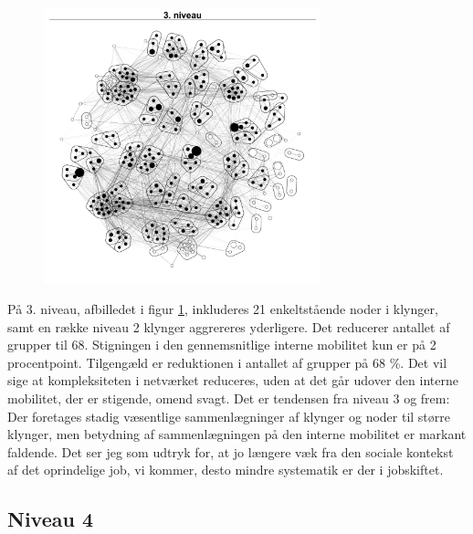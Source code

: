 \begin{figure}
  \vspace{-20pt}
  \begin{center}
   \caption{}
   \label{fig_delanalyse1_kort_seg_proces3}
    \includegraphics[width=8cm]{fig/netvaerkskort/kort_seg_proces3.pdf}
  \end{center}
  \vspace{-20pt}
\end{figure}

På 3. niveau, afbilledet i figur \ref{fig_delanalyse1_kort_seg_proces3}, inkluderes 21 enkeltstående noder i klynger, samt en række niveau 2 klynger aggrereres yderligere. Det reducerer antallet af grupper til 68. Stigningen i den gennemsnitlige interne mobilitet kun er på 2 procentpoint. Tilgengæld er reduktionen i antallet af grupper på 68 \%. Det vil sige at kompleksiteten i netværket reduceres, uden at det går udover den interne mobilitet, der er stigende, omend svagt. Det er tendensen fra niveau 3 og frem: Der foretages stadig væsentlige sammenlægninger af klynger og noder til større klynger, men betydning af sammenlægningen på den interne mobilitet er markant faldende. Det ser jeg som udtryk for, at jo længere væk fra den sociale kontekst af det oprindelige job, vi kommer, desto mindre systematik er der i jobskiftet.


\newpage \subsection{Niveau 4}

